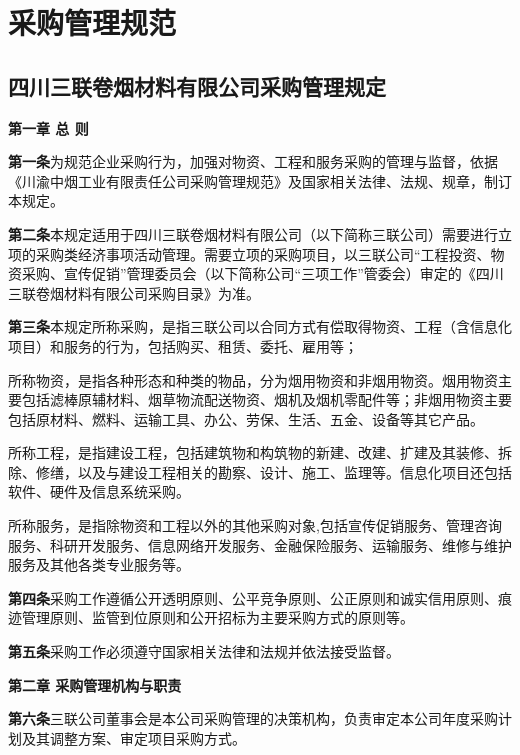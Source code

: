 ﻿\chapter{采购管理规范}\label{app:appendix2-1}
\section{四川三联卷烟材料有限公司采购管理规定}
\begin{center}
\textbf{第一章 \quad  总  则}
\end{center}

\textbf{第一条}\quad 为规范企业采购行为，加强对物资、工程和服务采购的管理与监督，依据《川渝中烟工业有限责任公司采购管理规范》及国家相关法律、法规、规章，制订本规定。

\textbf{第二条}\quad 本规定适用于四川三联卷烟材料有限公司（以下简称三联公司）需要进行立项的采购类经济事项活动管理。需要立项的采购项目，以三联公司“工程投资、物资采购、宣传促销”管理委员会（以下简称公司“三项工作”管委会）审定的《四川三联卷烟材料有限公司采购目录》为准。

\textbf{第三条}\quad 本规定所称采购，是指三联公司以合同方式有偿取得物资、工程（含信息化项目）和服务的行为，包括购买、租赁、委托、雇用等；

所称物资，是指各种形态和种类的物品，分为烟用物资和非烟用物资。烟用物资主要包括滤棒原辅材料、烟草物流配送物资、烟机及烟机零配件等；非烟用物资主要包括原材料、燃料、运输工具、办公、劳保、生活、五金、设备等其它产品。

所称工程，是指建设工程，包括建筑物和构筑物的新建、改建、扩建及其装修、拆除、修缮，以及与建设工程相关的勘察、设计、施工、监理等。信息化项目还包括软件、硬件及信息系统采购。

所称服务，是指除物资和工程以外的其他采购对象,包括宣传促销服务、管理咨询服务、科研开发服务、信息网络开发服务、金融保险服务、运输服务、维修与维护服务及其他各类专业服务等。

\textbf{第四条}\quad 采购工作遵循公开透明原则、公平竞争原则、公正原则和诚实信用原则、痕迹管理原则、监管到位原则和公开招标为主要采购方式的原则等。

\textbf{第五条}\quad 采购工作必须遵守国家相关法律和法规并依法接受监督。

\begin{center}
\textbf{第二章 \quad  采购管理机构与职责}
\end{center}

\textbf{第六条}\quad 三联公司董事会是本公司采购管理的决策机构，负责审定本公司年度采购计划及其调整方案、审定项目采购方式。

